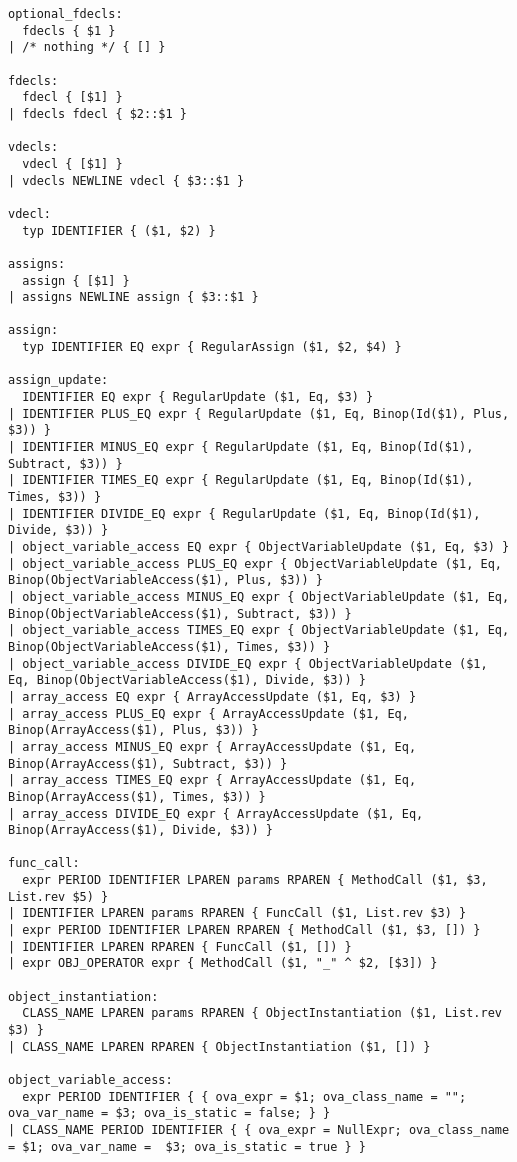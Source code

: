 \documentclass{article}
\begin{document}
\begin{verbatim}
optional_fdecls:
  fdecls { $1 }
| /* nothing */ { [] }

fdecls:
  fdecl { [$1] }
| fdecls fdecl { $2::$1 }

vdecls:
  vdecl { [$1] }
| vdecls NEWLINE vdecl { $3::$1 }

vdecl:
  typ IDENTIFIER { ($1, $2) }

assigns:
  assign { [$1] }
| assigns NEWLINE assign { $3::$1 }

assign:
  typ IDENTIFIER EQ expr { RegularAssign ($1, $2, $4) }

assign_update:
  IDENTIFIER EQ expr { RegularUpdate ($1, Eq, $3) }
| IDENTIFIER PLUS_EQ expr { RegularUpdate ($1, Eq, Binop(Id($1), Plus, $3)) }
| IDENTIFIER MINUS_EQ expr { RegularUpdate ($1, Eq, Binop(Id($1), Subtract, $3)) }
| IDENTIFIER TIMES_EQ expr { RegularUpdate ($1, Eq, Binop(Id($1), Times, $3)) }
| IDENTIFIER DIVIDE_EQ expr { RegularUpdate ($1, Eq, Binop(Id($1), Divide, $3)) }
| object_variable_access EQ expr { ObjectVariableUpdate ($1, Eq, $3) }
| object_variable_access PLUS_EQ expr { ObjectVariableUpdate ($1, Eq, Binop(ObjectVariableAccess($1), Plus, $3)) }
| object_variable_access MINUS_EQ expr { ObjectVariableUpdate ($1, Eq, Binop(ObjectVariableAccess($1), Subtract, $3)) }
| object_variable_access TIMES_EQ expr { ObjectVariableUpdate ($1, Eq, Binop(ObjectVariableAccess($1), Times, $3)) }
| object_variable_access DIVIDE_EQ expr { ObjectVariableUpdate ($1, Eq, Binop(ObjectVariableAccess($1), Divide, $3)) }
| array_access EQ expr { ArrayAccessUpdate ($1, Eq, $3) }
| array_access PLUS_EQ expr { ArrayAccessUpdate ($1, Eq, Binop(ArrayAccess($1), Plus, $3)) }
| array_access MINUS_EQ expr { ArrayAccessUpdate ($1, Eq, Binop(ArrayAccess($1), Subtract, $3)) }
| array_access TIMES_EQ expr { ArrayAccessUpdate ($1, Eq, Binop(ArrayAccess($1), Times, $3)) }
| array_access DIVIDE_EQ expr { ArrayAccessUpdate ($1, Eq, Binop(ArrayAccess($1), Divide, $3)) }

func_call:
  expr PERIOD IDENTIFIER LPAREN params RPAREN { MethodCall ($1, $3, List.rev $5) }
| IDENTIFIER LPAREN params RPAREN { FuncCall ($1, List.rev $3) }
| expr PERIOD IDENTIFIER LPAREN RPAREN { MethodCall ($1, $3, []) }
| IDENTIFIER LPAREN RPAREN { FuncCall ($1, []) }
| expr OBJ_OPERATOR expr { MethodCall ($1, "_" ^ $2, [$3]) }

object_instantiation:
  CLASS_NAME LPAREN params RPAREN { ObjectInstantiation ($1, List.rev $3) }
| CLASS_NAME LPAREN RPAREN { ObjectInstantiation ($1, []) }

object_variable_access:
  expr PERIOD IDENTIFIER { { ova_expr = $1; ova_class_name = ""; ova_var_name = $3; ova_is_static = false; } }
| CLASS_NAME PERIOD IDENTIFIER { { ova_expr = NullExpr; ova_class_name = $1; ova_var_name =  $3; ova_is_static = true } }


\end{verbatim}
\end{document}
